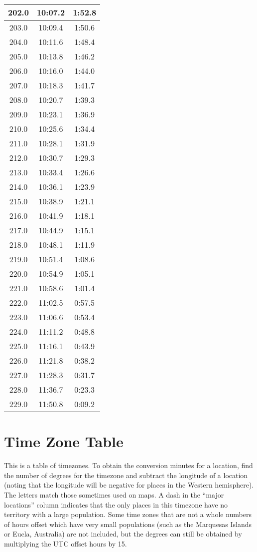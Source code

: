 \begin{footnotesize}
\begin{minipage}{0.25\textwidth}
\begin{tabular}[t]{c|c|c}
	202.0&10:07.2&1:52.8\\\hline
	203.0&10:09.4&1:50.6\\\hline
	204.0&10:11.6&1:48.4\\\hline
	205.0&10:13.8&1:46.2\\\hline
	206.0&10:16.0&1:44.0\\\hline
	207.0&10:18.3&1:41.7\\\hline
	208.0&10:20.7&1:39.3\\\hline
	209.0&10:23.1&1:36.9\\\hline
	210.0&10:25.6&1:34.4\\\hline
	211.0&10:28.1&1:31.9\\\hline
	212.0&10:30.7&1:29.3\\\hline
	213.0&10:33.4&1:26.6\\\hline
	214.0&10:36.1&1:23.9\\\hline
	215.0&10:38.9&1:21.1\\\hline
	216.0&10:41.9&1:18.1\\\hline
	217.0&10:44.9&1:15.1\\\hline
	218.0&10:48.1&1:11.9\\\hline
	219.0&10:51.4&1:08.6\\\hline
	220.0&10:54.9&1:05.1\\\hline
	221.0&10:58.6&1:01.4\\\hline
	222.0&11:02.5&0:57.5\\\hline
	223.0&11:06.6&0:53.4\\\hline
	224.0&11:11.2&0:48.8\\\hline
	225.0&11:16.1&0:43.9\\\hline
	226.0&11:21.8&0:38.2\\\hline
	227.0&11:28.3&0:31.7\\\hline
	228.0&11:36.7&0:23.3\\\hline
	229.0&11:50.8&0:09.2\\\hline
\end{tabular}\end{minipage}\newpage
\end{footnotesize}

\section{Time Zone Table}

This is a table of timezones. To obtain the conversion minutes for a location, find the number of degrees for the timezone and subtract the longitude of a location (noting that the longitude will be negative for places in the Western hemisphere). The letters match those sometimes used on maps. A dash in the “major locations” column indicates that the only places in this timezone have no territory with a large population. Some time zones that are not a whole numbers of hours offset which have very small populations (such as the Marquesas Islands or Eucla, Australia) are not included, but the degrees can still be obtained by multiplying the UTC offset hours by 15.

